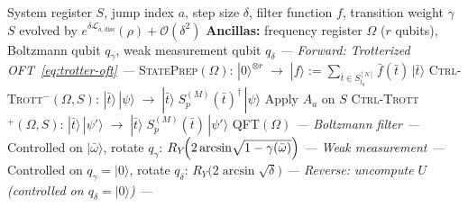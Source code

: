 \setcounter{algorithm}{0}
\renewcommand{\thealgorithm}{\arabic{algorithm}b}
\begin{algorithm}[!htbp]
\caption{\textsc{DissipativeStep}: weak measurement simulation of
         $e^{\delta\mathcal{L}_{a,\mathrm{diss}}}$}
\label{alg:diss}
\begin{algorithmic}[1]
\small
\Require System register $S$, jump index $a$, step size $\delta$, filter function $f$, transition weight $\gamma$
\Ensure  $S$ evolved by
  $e^{\delta\mathcal{L}_{a,\mathrm{diss}}}(\rho) + \mathcal{O}(\delta^2)$
\Statex
\State \textbf{Ancillas:}
  frequency register $\Omega$ ($r$ qubits),
  Boltzmann qubit $q_\gamma$,
  weak measurement qubit $q_\delta$
\Statex
\Statex \hfill \textit{--- Forward: Trotterized OFT~\eqref{eq:trotter-oft} ---}
\State \textsc{StatePrep}$(\Omega)$:
  $|0\rangle^{\otimes r} \;\longrightarrow\;
   |f\rangle := \sum_{\bar{t}\in S_{t_0}^{[N]}}
   \bar{f}(\bar{t})\,|\bar{t}\rangle$
\State \textsc{Ctrl-Trott}$^{-}(\Omega, S)$:
  $|\bar{t}\rangle\,|\psi\rangle \;\longrightarrow\;
   |\bar{t}\rangle\; S_p^{(M)}(\bar{t})^\dagger \,|\psi\rangle$
\State Apply $A_a$ on $S$
\State \textsc{Ctrl-Trott}$^{+}(\Omega, S)$:
  $|\bar{t}\rangle\,|\psi'\rangle \;\longrightarrow\;
   |\bar{t}\rangle\; S_p^{(M)}(\bar{t})\,|\psi'\rangle$
\State \textsc{QFT}$(\Omega)$
\Statex {}
\Statex
\Statex \textit{--- Boltzmann filter ---}
\State Controlled on $|\bar\omega\rangle$, rotate $q_\gamma$:\;
  $R_Y\!\Bigl(2\arcsin\!\sqrt{1-\gamma(\bar\omega)}\Bigr)$
\Statex {}
\Statex
\Statex \textit{--- Weak measurement ---}
\State Controlled on $q_\gamma = |0\rangle$, rotate $q_\delta$:\;
  $R_Y\!\bigl(2\arcsin\!\sqrt{\delta}\bigr)$
\Statex {}
\Statex
\Statex \textit{--- Reverse: uncompute $U$ (controlled on $q_\delta = |0\rangle$) ---}

\end{algorithmic}
\end{algorithm}
